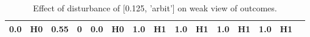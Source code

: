 \begin{table}
\begin{tabular}{l|cc|cc|cc|cc|cc|cc|cc}
\cellcolor{Bittersweet}0.0&\cellcolor{Bittersweet}H0&\cellcolor{Bittersweet}0.55&\cellcolor{Bittersweet}0&\cellcolor{Bittersweet}0.0&\cellcolor{Bittersweet}H0&\cellcolor{Bittersweet}1.0&\cellcolor{Bittersweet}H1&\cellcolor{Bittersweet}1.0&\cellcolor{Bittersweet}H1&\cellcolor{Bittersweet}1.0&\cellcolor{Bittersweet}H1&\cellcolor{Bittersweet}1.0&\cellcolor{Bittersweet}H1\\\bottomrule\end{tabular}\caption{Effect of disturbance of [0.125, 'arbit'] on weak view of outcomes.}\end{table}